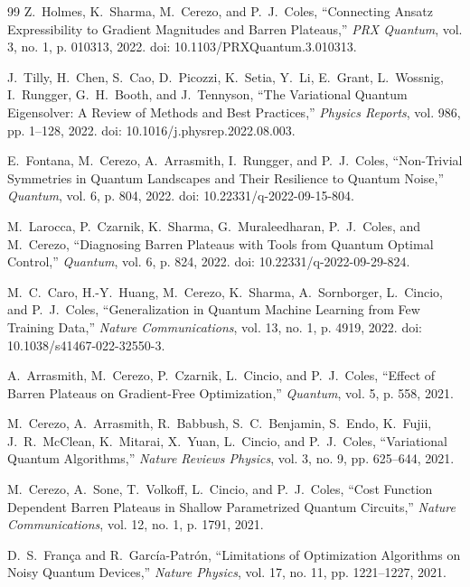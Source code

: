 \documentclass[pdflatex,sn-mathphys-num]{sn-jnl}%
\theoremstyle{thmstyleone}%
\theoremstyle{thmstyletwo}%
\theoremstyle{thmstylethree}%
\begin{document}
\begin{thebibliography}{99}
Z.~Holmes, K.~Sharma, M.~Cerezo, and P.~J.~Coles,
``Connecting Ansatz Expressibility to Gradient Magnitudes and Barren Plateaus,''
\emph{PRX Quantum}, vol. 3, no. 1, p. 010313, 2022.
doi: 10.1103/PRXQuantum.3.010313.

J.~Tilly, H.~Chen, S.~Cao, D.~Picozzi, K.~Setia, Y.~Li,
E.~Grant, L.~Wossnig, I.~Rungger, G.~H.~Booth, and J.~Tennyson,
``The Variational Quantum Eigensolver: A Review of Methods and Best Practices,''
\emph{Physics Reports}, vol. 986, pp. 1--128, 2022.
doi: 10.1016/j.physrep.2022.08.003.

E.~Fontana, M.~Cerezo, A.~Arrasmith, I.~Rungger, and P.~J.~Coles,
``Non-Trivial Symmetries in Quantum Landscapes and Their Resilience to Quantum Noise,''
\emph{Quantum}, vol. 6, p. 804, 2022.
doi: 10.22331/q-2022-09-15-804.

M.~Larocca, P.~Czarnik, K.~Sharma, G.~Muraleedharan,
P.~J.~Coles, and M.~Cerezo,
``Diagnosing Barren Plateaus with Tools from Quantum Optimal Control,''
\emph{Quantum}, vol. 6, p. 824, 2022.
doi: 10.22331/q-2022-09-29-824.

M.~C.~Caro, H.-Y.~Huang, M.~Cerezo, K.~Sharma, A.~Sornborger,
L.~Cincio, and P.~J.~Coles,
``Generalization in Quantum Machine Learning from Few Training Data,''
\emph{Nature Communications}, vol. 13, no. 1, p. 4919, 2022.
doi: 10.1038/s41467-022-32550-3.

A.~Arrasmith, M.~Cerezo, P.~Czarnik, L.~Cincio, and P.~J.~Coles,
``Effect of Barren Plateaus on Gradient-Free Optimization,''
\emph{Quantum}, vol. 5, p. 558, 2021.

M.~Cerezo, A.~Arrasmith, R.~Babbush, S.~C.~Benjamin, S.~Endo,
K.~Fujii, J.~R.~McClean, K.~Mitarai, X.~Yuan, L.~Cincio,
and P.~J.~Coles,
``Variational Quantum Algorithms,''
\emph{Nature Reviews Physics}, vol. 3, no. 9,
pp. 625--644, 2021.

M.~Cerezo, A.~Sone, T.~Volkoff, L.~Cincio, and P.~J.~Coles,
``Cost Function Dependent Barren Plateaus in Shallow Parametrized Quantum Circuits,''
\emph{Nature Communications}, vol. 12, no. 1, p. 1791, 2021.

D.~S.~Fran{\c{c}}a and R.~Garc{\'i}a-Patr{\'o}n,
``Limitations of Optimization Algorithms on Noisy Quantum Devices,''
\emph{Nature Physics}, vol. 17, no. 11,
pp. 1221--1227, 2021.


\end{thebibliography}
\end{document}

